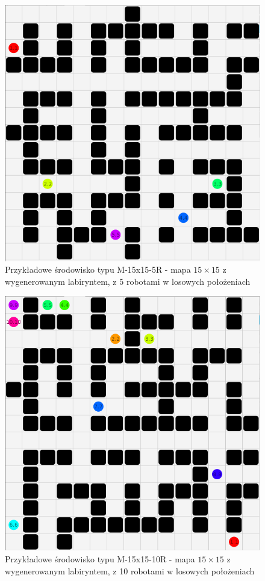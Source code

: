 \begin{figure}
	\centering
	\includegraphics[width=0.6\columnwidth]{img/robopath/tests-15-15-5}
	\caption{Przykładowe środowisko typu M-15x15-5R - mapa $15 \times 15$ z wygenerowanym labiryntem, z 5 robotami w losowych położeniach}
	\label{fig:test-env-15-15-5}
\end{figure}

\begin{figure}
	\centering
	\includegraphics[width=0.6\columnwidth]{img/robopath/tests-15-15-10}
	\caption{Przykładowe środowisko typu M-15x15-10R - mapa $15 \times 15$ z wygenerowanym labiryntem, z 10 robotami w losowych położeniach}
	\label{fig:test-env-15-15-10}
\end{figure}

